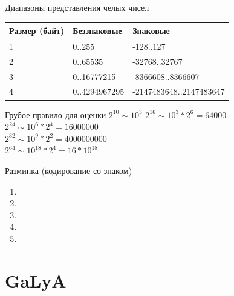 \documentclass{beamer}
\begin{document}
    \begin{frame}{Диапазоны представления челых чисел}
        \begin{table}
            \begin{tabular}{|l|l|l|}
            \hline Размер (байт) & Беззнаковые & Знаковые \\
            \hline   1           &  0..255     & -128..127 \\
            \hline   2           &  0..65535   & -32768..32767 \\
            \hline   3           &  0..16777215 & -8366608..8366607 \\
            \hline   4           &  0..4294967295 & -2147483648..2147483647 \\
            \hline
            \end{tabular}    
        \end{table}
        \begin{block}{Грубое правило для оценки $ 2^{10} \sim 10^3$}
            $2^{16} \sim 10^3 * 2^6 = 64000$ \\
            $2^{24} \sim 10^6 * 2^4 = 16000000$ \\
            $2^{32} \sim 10^9 * 2^2 = 4000000000$ \\
            $2^{64} \sim 10^{18} * 2^4 = 16 *10^{18}$
        \end{block}
    \end{frame}
    \begin{frame}{Разминка (кодирование со знаком)}
        \begin{enumerate}
            \item {}
            \item<2-> 
            \item<3-> 
            \item<4-> 
            \item<5-> 
        \end{enumerate} 
    \end{frame}
    \section{GaLyA}
\end{document}

